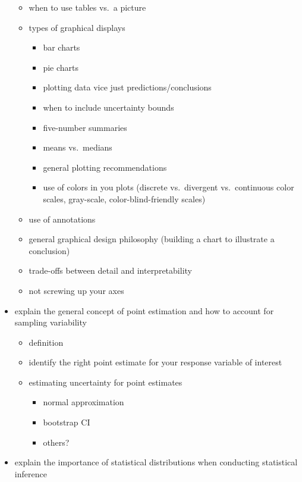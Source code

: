 \documentclass[]{book}
\providecommand{\tightlist}{%
  \setlength{\itemsep}{0pt}\setlength{\parskip}{0pt}}
\begin{document}
\begin{itemize}
  \begin{itemize}
  \tightlist
  \item
    when to use tables vs.~a picture
  \item
    types of graphical displays

    \begin{itemize}
    \tightlist
    \item
      bar charts
    \item
      pie charts
    \item
      plotting data vice just predictions/conclusions
    \item
      when to include uncertainty bounds
    \item
      five-number summaries
    \item
      means vs.~medians
    \item
      general plotting recommendations
    \item
      use of colors in you plots (discrete vs.~divergent vs.~continuous color scales, gray-scale, color-blind-friendly scales)
    \end{itemize}
  \item
    use of annotations
  \item
    general graphical design philosophy (building a chart to illustrate a conclusion)
  \item
    trade-offs between detail and interpretability
  \item
    not screwing up your axes
  \end{itemize}
\item
  explain the general concept of point estimation and how to account for sampling variability

  \begin{itemize}
  \tightlist
  \item
    definition
  \item
    identify the right point estimate for your response variable of interest
  \item
    estimating uncertainty for point estimates

    \begin{itemize}
    \tightlist
    \item
      normal approximation
    \item
      bootstrap CI
    \item
      others?
    \end{itemize}
  \end{itemize}
\item
  explain the importance of statistical distributions when conducting statistical inference


\end{itemize}
\end{document}
